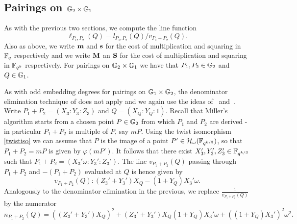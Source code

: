 \subsection{Pairings on $\mathbb{G}_{2} \times \mathbb{G}_{1}$}

As with the previous two sections, we compute the line function 
$$\ell_{P_1,P_2}(Q) = l_{P_1,P_2}(Q)/v_{P_1 + P_2}(Q).$$
Also as above, we write $\textbf{m}$ and $\textbf{s}$ for the cost of multiplication and squaring in $\mathbb{F}_{q}$ respectively and we write $\textbf{M}$ an $\textbf{S}$ for the cost of multiplication and squaring in $\mathbb{F}_{q^k}$ respectively. For pairings on $\mathbb{G}_{2} \times \mathbb{G}_{1}$ we have that $P_1, P_2 \in \mathbb{G}_{2}$ and $Q \in \mathbb{G}_{1}$.

As with odd embedding degrees for pairings on $\mathbb{G}_{1} \times \mathbb{G}_{2}$, 
the denominator elimination technique of \cite{2010/Gu} does not apply
 and we again use the ideas of~\cite{2008/lin} and~\cite{2009/deg15}.
Write $P_1 + P_2 = (X_3:Y_3:Z_3)$ and $Q = (X_Q:Y_Q:1)$. 
Recall that Miller's algorithm starts from a chosen point $P \in \mathbb{G}_{2}$
from which $P_1$ and $P_2$ are derived - in particular $P_1 + P_2$ is
multiple of $P$, say $mP$.
Using the twist isomorphism \eqref{twistiso} we can assume that
$P$ is the image of a point $P' \in \mathcal{H}_{\omega}(\mathbb{F}_{q^{k/3}})$,
so that $P_1 + P_2 = mP$ is given by $\varphi(mP')$.
It follows that there exist $X_3', Y_3',Z_3' \in \mathbb{F}_{q^{k/3}}$ such that
$P_1 + P_2 = (X_3'\omega : Y_3':Z_3')$. 
The line $v_{P_1+P_2}(Q)$ passing through $P_1+P_2$ and $-(P_1 + P_2)$ 
evaluated at $Q$
is hence given by
\[v_{P_1+P_2}(Q): 
(Z_3' + Y_3')X_Q - (1+Y_Q)X_3'\omega.\]
Analogously to the denominator elimination in the previous, we
replace $\frac{1}{v_{P_1+P_2}(Q)}$ by the numerator 
$$n_{P_1+P_2}(Q) = ((Z_3' + Y_3')X_Q)^2 
+ (Z_3' + Y_3')X_Q(1+Y_Q)X_3'\omega 
+ ((1+Y_Q)X_3')^2\omega^2.$$

